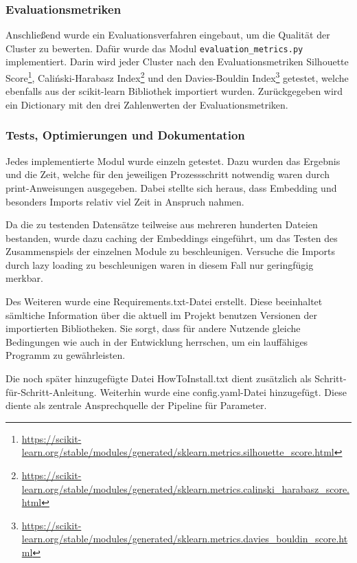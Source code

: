 \subsubsection*{Evaluationsmetriken}
Anschließend wurde ein Evaluationsverfahren eingebaut, um die Qualität der Cluster zu bewerten. Dafür wurde das Modul \texttt{evaluation\_metrics.py} implementiert. Darin wird jeder Cluster nach den Evaluationsmetriken Silhouette Score\footnote{\url{https://scikit-learn.org/stable/modules/generated/sklearn.metrics.silhouette_score.html}}, Caliński-Harabasz Index\footnote{\url{https://scikit-learn.org/stable/modules/generated/sklearn.metrics.calinski_harabasz_score.html}} und den Davies-Bouldin Index\footnote{\url{https://scikit-learn.org/stable/modules/generated/sklearn.metrics.davies_bouldin_score.html}} getestet, welche ebenfalls aus der scikit-learn Bibliothek importiert wurden. Zurückgegeben wird ein Dictionary mit den drei Zahlenwerten der Evaluationsmetriken.


\subsubsection*{Tests, Optimierungen und Dokumentation}
Jedes implementierte Modul wurde einzeln getestet. Dazu wurden das Ergebnis und die Zeit, welche für den jeweiligen Prozessschritt notwendig waren durch print-Anweisungen ausgegeben. Dabei stellte sich heraus, dass Embedding und besonders Imports relativ viel Zeit in Anspruch nahmen.

Da die zu testenden Datensätze teilweise aus mehreren hunderten Dateien bestanden, wurde dazu caching der Embeddings eingeführt, um das Testen des Zusammenspiels der einzelnen Module zu beschleunigen. Versuche die Imports durch lazy loading zu beschleunigen waren in diesem Fall nur geringfügig merkbar.

Des Weiteren wurde eine Requirements.txt-Datei erstellt. Diese beeinhaltet sämltiche Information über die aktuell im Projekt benutzen Versionen der importierten Bibliotheken. Sie sorgt, dass für andere Nutzende gleiche Bedingungen wie auch in der Entwicklung herrschen, um ein lauffähiges Programm zu gewährleisten.

Die noch später hinzugefügte Datei HowToInstall.txt dient zusätzlich als Schritt-für-Schritt-Anleitung. Weiterhin wurde eine config.yaml-Datei hinzugefügt. Diese diente als zentrale Ansprechquelle der Pipeline für Parameter.


